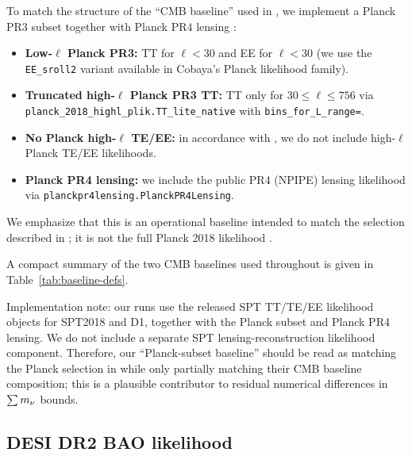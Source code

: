 To match the structure of the ``CMB baseline'' used in \cite{arxiv2601_16277}, we implement a Planck PR3 subset together with Planck PR4 lensing \cite{planck2018_likelihood}:
\begin{itemize}[leftmargin=*, itemsep=2pt]
  \item \textbf{Low-$\ell$ Planck PR3:} TT for $\ell<30$ and EE for $\ell<30$ (we use the \texttt{EE\_sroll2} variant available in Cobaya's Planck likelihood family).
  \item \textbf{Truncated high-$\ell$ Planck PR3 TT:} TT only for $30\le \ell\le 756$ via \texttt{planck\_2018\_highl\_plik.\allowbreak TT\_lite\_native} with \texttt{bins\_for\_L\_range=\allowbreak[30,756]}.
  \item \textbf{No Planck high-$\ell$ TE/EE:} in accordance with \cite{arxiv2601_16277}, we do not include high-$\ell$ Planck TE/EE likelihoods.
  \item \textbf{Planck PR4 lensing:} we include the public PR4 (NPIPE) lensing likelihood \cite{planck_pr4_lensing,planck_pr4_lensing_maps} via
    \texttt{planckpr4lensing.PlanckPR4Lensing}.
\end{itemize}
We emphasize that this is an operational baseline intended to match the selection described in \cite{arxiv2601_16277}; it is not the full Planck 2018 likelihood \cite{planck2018_cosmoparams}.

A compact summary of the two CMB baselines used throughout is given in Table~\ref{tab:baseline-defs}.

\begin{table}[t]
  \centering
  \caption{Baseline definitions as described in \cite{arxiv2601_16277} (CMB and CMB-D1). In our implementation we match the Planck-subset + PR4 lensing structure and swap only the SPT TT/TE/EE likelihood release; see text for any deviations.}
  \label{tab:baseline-defs}
  \small
  
\end{table}

Implementation note: our runs use the released SPT TT/TE/EE likelihood objects for SPT2018 and D1, together with the Planck subset and Planck PR4 lensing. We do not include a separate SPT lensing-reconstruction likelihood component. Therefore, our ``Planck-subset baseline'' should be read as matching the Planck selection in \cite{arxiv2601_16277} while only partially matching their CMB baseline composition; this is a plausible contributor to residual numerical differences in $\sum m_\nu$ bounds.

\subsection{DESI DR2 BAO likelihood}
\label{sec:desi-bao}

